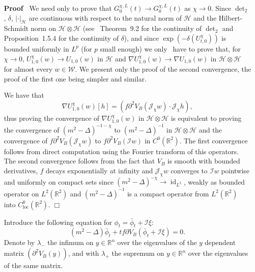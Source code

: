 \documentclass[a4paper,10pt]{article}
\newcommand{\tmop}[1]{\ensuremath{\operatorname{#1}}}
\newenvironment{proof}{\noindent\textbf{Proof\ }}{\hspace*{\fill}$\Box$\medskip}
\begin{document}
\begin{proof}
  We need only to prove that $G^{\chi, L}_0 (t) \rightarrow G^{\chi, L}_0 (t)$
  as $\chi \rightarrow 0$. Since $\det\nolimits_2$, $\delta$, $| \cdot |_{\mathcal{H}}$
  are continuous with respect to the natural norm of $\mathcal{H}$ and the
  Hilbert-Schmidt norm on $\mathcal{H} \otimes \mathcal{H}$
  (see~{\cite{Simon2005}} Theorem~9.2 for the continuity of $\det\nolimits_2$
  and~{\cite{Nualart2006}} Proposition~1.5.4 for the continuity of $\delta$),
  and since $\exp (- \delta (U^{\chi}_{t, 0}))$ is bounded uniformly in $L^p$
  (for $p$ small enough) we only \ have to prove that, for $\chi \rightarrow
  0$, $U^{\chi}_{1, 0} (w) \rightarrow U_{1, 0} (w)$ in $\mathcal{H}$ and
  $\nabla U^{\chi}_{1, 0} (w) \rightarrow \nabla U_{1, 0} (w)$ in $\mathcal{H}
  \otimes \mathcal{H}$ for almost every $w \in \mathcal{W}$. We present only
  the proof of the second convergence, the proof of the first one being
  simpler and similar.
  
  We have that
  \[ \nabla U^{\chi}_{1, 0} (w) [h] = (f \partial^2 V_B (\mathcal{J}_{\chi} w)
     \cdot \mathcal{J}_{\chi} h), \]
  thus proving the convergence of $\nabla U^{\chi}_{1, 0} (w)$ in $\mathcal{H}
  \otimes \mathcal{H}$ is equivalent to proving the convergence of $(m^2 -
  \Delta)^{- 1 - \chi}$ to $(m^2 - \Delta)^{- 1}$ in $\mathcal{H} \otimes
  \mathcal{H}$ and the convergence of $f \partial^2 V_B (\mathcal{J}_{\chi}
  w)$ to $f \partial^2 V_B (\mathcal{I} w)$ in $C^0 (\mathbb{R}^2)$. The first
  convergence follows from direct computation using the Fourier transform of
  this operators. The second convergence follows from the fact that $V_B$ is
  smooth with bounded derivatives, $f$ decays exponentially at infinity and
  $\mathcal{J}_{\chi} w$ converges to $\mathcal{I} w$ pointwise and uniformly
  on compact sets since $(m^2 - \Delta)^{- \chi} \rightarrow \tmop{id}_{L^2}$,
  weakly as bounded operator on $L^2 (\mathbb{R}^2)$ and $(m^2 - \Delta)^{-
  1}$ is a compact operator from $L^2 (\mathbb{R}^2)$ into $C^0_{\tmop{loc}}
  (\mathbb{R}^2)$.
\end{proof}

Introduce the following equation for $\phi_t = \bar{\phi}_t +\mathcal{I} \xi$:
\begin{equation}
  (m^2 - \Delta) \bar{\phi}_t + t f \partial V_B (\bar{\phi}_t +\mathcal{I}
  \xi) = 0 \label{equationanalytic1} .
\end{equation}
Denote by $\lambda_-$ the infimum on $y \in \mathbb{R}^n$ over the eigenvalues
of the $y$ dependent matrix $(\partial^2 V_B (y))$, and with $\lambda_+$ the
supremum on $y \in \mathbb{R}^n$ over the eigenvalues of the same matrix.
\end{document}
